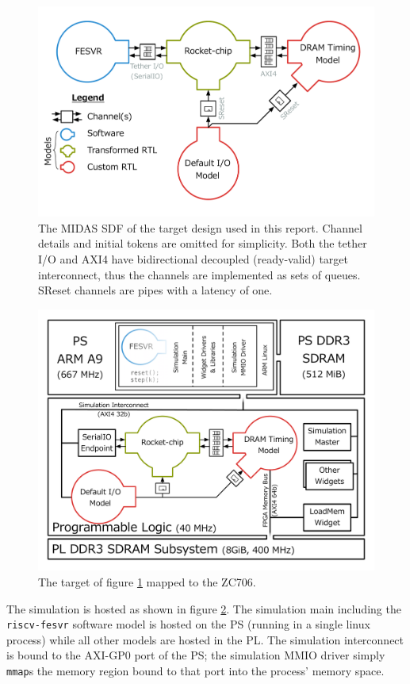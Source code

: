 \begin{figure}
	\centering
	\includegraphics[width=\textwidth]{figures/masters-target.pdf}
    \caption{The MIDAS SDF of the target design used in this report. Channel
    details and initial tokens are omitted for simplicity. Both the tether I/O
    and AXI4 have bidirectional decoupled (ready-valid) target interconnect,
    thus the channels are implemented as sets of queues. SReset channels are pipes with
    a latency of one.}
	\label{fig:default-target}
\end{figure}

\begin{figure}
	\centering
	\includegraphics[width=\textwidth]{figures/hosted-masters-target.pdf}
    \caption{The target of figure \ref{fig:default-target} mapped to the ZC706.}
	\label{fig:hosted-masters-target}
\end{figure}

The simulation is hosted as shown in figure \ref{fig:hosted-masters-target}.
The simulation main including the \texttt{riscv-fesvr} software model is hosted
on the PS (running in a single linux process) while all other models are hosted
in the PL. The simulation interconnect is bound to the AXI-GP0 port of the PS;
the simulation MMIO driver simply \texttt{mmap}s the memory region bound to that port
into the process' memory space.
